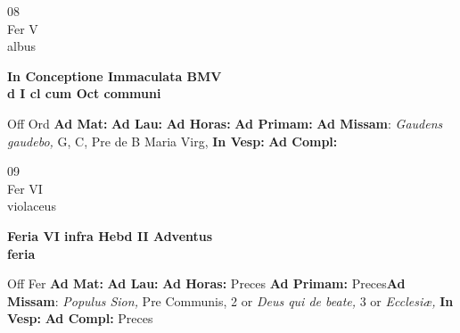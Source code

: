 \documentclass[10pt, openany]{book}
\begin{document}
    \begin{center}
        \begin{minipage}{3.5in}
            \vspace{2em}
            \begin{minipage}{0.5in}
                {\Huge 08} \\
                {\normalsize Fer V} \\
                {\normalsize albus}
            \end{minipage}
            \begin{minipage}{3.0in}
                \textbf{ \large In Conceptione Immaculata BMV \\
                \textnormal{\normalsize d I cl cum Oct communi}} \\ 
            \end{minipage}
            \begin{justify}Off Ord
                \textbf{Ad Mat: }
                \textbf{Ad Lau: }
                \textbf{Ad Horas: }
                \textbf{Ad Primam: }\textbf{Ad Missam}: \textit{Gaudens gaudebo,} G, C, Pre de B Maria Virg,  
                \textbf{In Vesp: }
                \textbf{Ad Compl: }
            \end{justify}
        \end{minipage}
    \end{center}

    \begin{center}
        \begin{minipage}{3.5in}
            \vspace{2em}
            \begin{minipage}{0.5in}
                {\Huge 09} \\
                {\normalsize Fer VI} \\
                {\normalsize violaceus}
            \end{minipage}
            \begin{minipage}{3.0in}
                \textbf{ \large Feria VI infra Hebd II Adventus \\
                \textnormal{\normalsize feria}} \\ 
            \end{minipage}
            \begin{justify}Off Fer
                \textbf{Ad Mat: }
                \textbf{Ad Lau: }
                \textbf{Ad Horas: }Preces
                \textbf{Ad Primam: }Preces\textbf{Ad Missam}: \textit{Populus Sion,} Pre Communis, 2 or \textit{Deus qui de beate,} 3 or \textit{Ecclesiæ,}  
                \textbf{In Vesp: }
                \textbf{Ad Compl: }Preces
            \end{justify}
        \end{minipage}
    \end{center}
\end{document}
